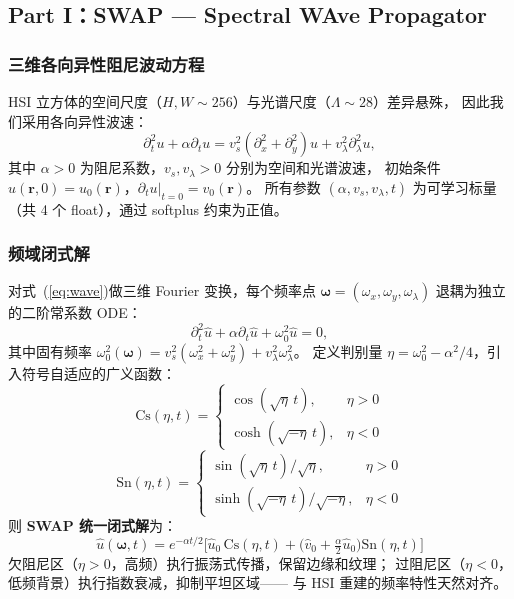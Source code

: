 \documentclass[a4paper,11pt,twocolumn]{ctexart}
\newcommand{\swap}{\textsc{SWAP}}
\newcommand{\Cs}{\mathrm{Cs}}
\newcommand{\Sn}{\mathrm{Sn}}
\begin{document}
\subsection{Part I：\swap{} — Spectral WAve Propagator}\label{sec:swap}

\subsubsection{三维各向异性阻尼波动方程}

HSI 立方体的空间尺度（$H, W \sim 256$）与光谱尺度（$\Lambda \sim 28$）差异悬殊，
因此我们采用各向异性波速：
\begin{equation}
\partial_t^2 u + \alpha \partial_t u = v_s^2(\partial_x^2 + \partial_y^2)u + v_\lambda^2 \partial_\lambda^2 u,
\label{eq:wave}
\end{equation}
其中 $\alpha > 0$ 为阻尼系数，$v_s, v_\lambda > 0$ 分别为空间和光谱波速，
初始条件 $u(\mathbf{r},0) = u_0(\mathbf{r})$，$\partial_t u|_{t=0} = v_0(\mathbf{r})$。
所有参数 $(\alpha, v_s, v_\lambda, t)$ 为可学习标量（共 4 个 float），通过 softplus 约束为正值。

\subsubsection{频域闭式解}

对式~(\ref{eq:wave})做三维 Fourier 变换，每个频率点 $\bm{\omega} = (\omega_x, \omega_y, \omega_\lambda)$ 退耦为独立的二阶常系数 ODE：
\begin{equation}
\partial_t^2 \hat{u} + \alpha \partial_t \hat{u} + \omega_0^2 \hat{u} = 0,
\label{eq:ode}
\end{equation}
其中固有频率 $\omega_0^2(\bm\omega) = v_s^2(\omega_x^2 + \omega_y^2) + v_\lambda^2 \omega_\lambda^2$。
定义判别量 $\eta = \omega_0^2 - \alpha^2/4$，引入符号自适应的广义函数：
\begin{equation}
\Cs(\eta, t) = \begin{cases} \cos(\sqrt{\eta}\,t), & \eta > 0 \\ \cosh(\sqrt{-\eta}\,t), & \eta < 0 \end{cases}
\end{equation}
\begin{equation}
\Sn(\eta, t) = \begin{cases} \sin(\sqrt{\eta}\,t)/\sqrt{\eta}, & \eta > 0 \\ \sinh(\sqrt{-\eta}\,t)/\sqrt{-\eta}, & \eta < 0 \end{cases}
\end{equation}
则 \textbf{\swap{} 统一闭式解}为：
\begin{equation}
\boxed{
\hat{u}(\bm\omega, t) = e^{-\alpha t/2}\Big[\hat{u}_0\,\Cs(\eta, t) + \big(\hat{v}_0 + \tfrac{\alpha}{2}\hat{u}_0\big)\Sn(\eta, t)\Big]
}
\label{eq:closed_form}
\end{equation}
欠阻尼区（$\eta > 0$，高频）执行振荡式传播，保留边缘和纹理；
过阻尼区（$\eta < 0$，低频背景）执行指数衰减，抑制平坦区域——
与 HSI 重建的频率特性天然对齐。
\end{document}
